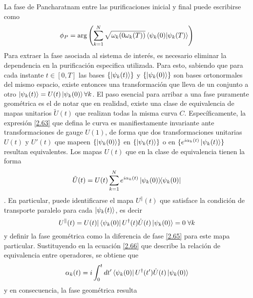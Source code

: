 La fase de Pancharatnam entre las purificaciones inicial y final puede escribirse como
\begin{equation} 
    \phi_P=\arg \left( \sum_{k=1}^{N} \sqrt{\omega_k(0\omega_k(T))}\braket{\psi_k(0)}{\psi_k(T)} \right)
\end{equation}
Para extraer la fase asociada al sistema de interés, es necesario eliminar la dependencia en la purificación especifica utilizada. Para esto, sabiendo que para cada instante $t\in[0,T]$ las bases $\{\ket{\psi_k(t)}\}$ y $\{\ket{\psi_k(0)}\}$ son bases ortonormales del mismo espacio, existe entonces una transformación que lleva de un conjunto a otro $\ket{\psi_k(t)}=U(t)\ket{\psi_k(0)} \forall k$. El paso esencial para arribar a una fase puramente geométrica es el de notar que en realidad, existe una clase de equivalencia de mapas unitarios $\tilde U(t)$ que realizan todas la misma curva $C$. Específicamente, la expresión \ref{2.63} que defina le curva es manifiestamente invariante ante transformaciones de gauge $U(1)$, de forma que dos transformaciones unitarias $U(t)$ y $U'(t)$ que mapeen $\{\ket{\psi_k(0)}\}$ en $\{\ket{\psi_k(t)}\}$ o en $\{e^{i\alpha_k(t)}\ket{\psi_k(t)}\}$ resultan equivalentes. Los mapas $U(t)$ que en la clase de equivalencia tienen la forma 
\begin{equation}
    \tilde U(t) = U(t)\sum_{k=1}^{N}e^{i\alpha_k(t)}\ketbra{\psi_k(0)}{\psi_k(0)}
\end{equation}
. En particular, puede identificarse el mapa $U^\parallel(t)$ que satisface la condición de transporte paralelo para cada $\ket{\psi_k(t)}$, es decir
\begin{equation}
    U^\parallel(t)=U(t) | \bra{\psi_k(0)}U^\dagger(t)\dot U(t)\ket{\psi_k(0)}=0 \; \forall k
\end{equation}
y definir la fase geométrica como la diferencia de fase \ref{2.65} para este mapa particular. Sustituyendo en la ecuación \ref{2.66} que describe la relación de equivalencia entre operadores, se obtiene que 
\begin{equation}
    \alpha_k(t)=i\int_{0}^{t}dt'\bra{\psi_k(0)}U^\dagger(t')\dot U(t)\ket{\psi_k(0)}
\end{equation}
y en consecuencia, la fase geométrica resulta

